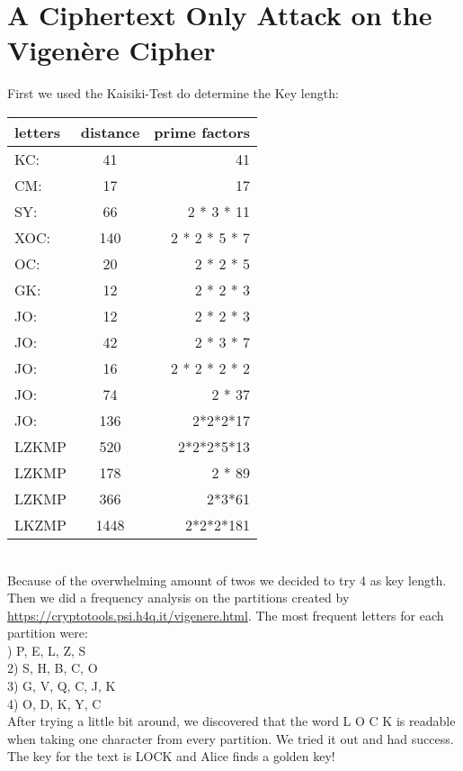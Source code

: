 \section{A Ciphertext Only Attack on the Vigenère Cipher}

First we used the Kaisiki-Test do determine the Key length:\\
\newline
\begin{tabular}{l | c | r}
	letters & distance & prime factors\\
	\hline
	KC:&  41 & 41\\
	CM:&  17 & 17\\
	SY:& 66 & 2  *  3  * 11\\
	XOC:& 140 & 2  *  2  *  5  *  7\\
	OC:& 20 & 2  *  2  *  5\\
	GK:& 12 & 2  *  2  *  3\\
	JO:& 12 & 2  *  2  *  3\\
	JO:& 42 &	2 * 3 * 7\\
	JO:& 16 & 2 * 2 * 2 * 2\\
	JO:& 74 & 2 * 37\\
	JO:& 136 & 2*2*2*17\\	
	LZKMP & 520 & 2*2*2*5*13\\
	LZKMP & 178 & 2 * 89\\
	LZKMP & 366 & 2*3*61\\
	LKZMP & 1448 & 2*2*2*181\\  
\end{tabular}\\
\newline
Because of the overwhelming amount of twos we decided to try 4 as key length.
Then we did a frequency analysis on the partitions created by \url{https://cryptotools.psi.h4q.it/vigenere.html}.
The most frequent letters for each partition were:\\
) P, E, L, Z, S\\
2) S, H, B, C, O\\
3) G, V, Q, C, J, K\\
4) O, D, K, Y, C\\


After trying a little bit around, we discovered that the word L O C K is readable when taking one character from every partition. We tried it out and had success. The key for the text is LOCK and Alice finds a golden key!
